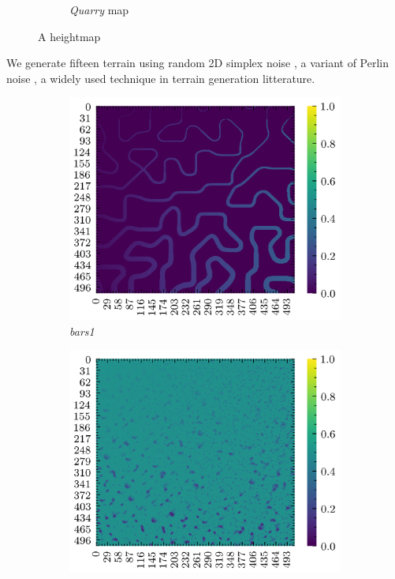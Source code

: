 \documentclass[../document.tex]{subfiles}
\begin{document}
\begin{figure}[H]
\begin{subfigure}[b]{0.45\linewidth}
            \caption{\emph{Quarry} map}
            \end{subfigure}    
    \caption{A heightmap}
    \end{figure}
We generate fifteen terrain using random 2D simplex noise \cite{simplex}, a variant of Perlin noise \cite{perlin}, a widely used technique in terrain generation litterature.
\begin{figure}[H]
    \centering
        \begin{subfigure}[b]{0.45\textwidth}
            \includegraphics[width=\textwidth]{../img/hm/bars1.png}
            \caption{\emph{bars1}}
        \end{subfigure}
        \begin{subfigure}[b]{0.45\linewidth}
            \includegraphics[width=\textwidth]{../img/hm/holes1.png}

\end{subfigure}
\end{figure}
\end{document}
